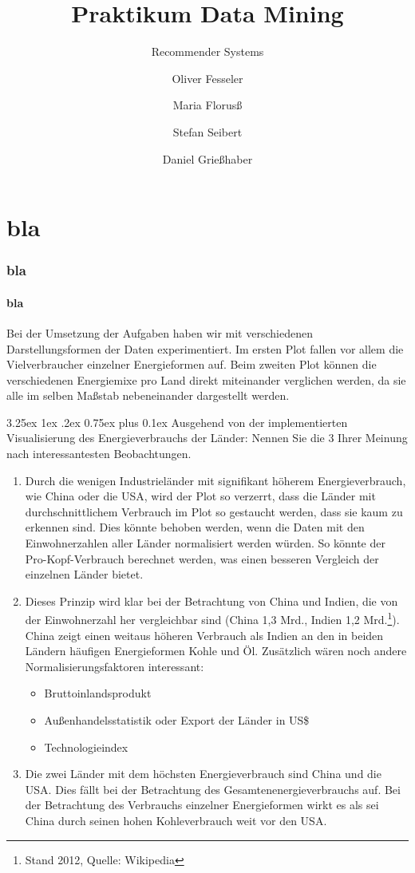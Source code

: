 \documentclass[12pt,a4paper]{scrartcl}
\makeatletter
\renewcommand\subparagraph{\@startsection{subparagraph}{5}{\parindent}%
    {3.25ex \@plus1ex \@minus .2ex}%
    {0.75ex plus 0.1ex}%
    {\normalfont\normalsize\bfseries}}
\makeatother
\begin{document}
\title{Praktikum Data Mining}
\subtitle{Recommender Systems}
\author{Oliver Fesseler \and Maria Florus\ss \and Stefan Seibert \and  Daniel Grie\ss haber}
\maketitle
\newpage

\part*{bla}

\section*{bla}
\subsection*{bla}

Bei der Umsetzung der Aufgaben haben wir mit verschiedenen Darstellungsformen der Daten experimentiert. Im ersten Plot fallen vor allem die Vielverbraucher einzelner Energieformen auf. Beim zweiten Plot k\"onnen die verschiedenen Energiemixe pro Land direkt miteinander verglichen werden, da sie alle im selben Ma\ss stab nebeneinander dargestellt werden.

\subparagraph{ Ausgehend von der implementierten Visualisierung des Energieverbrauchs der L\"ander: Nennen Sie die 3 Ihrer Meinung nach interessantesten Beobachtungen.}

\begin{enumerate}
\item Durch die wenigen Industriel\"ander mit signifikant h\"oherem Energieverbrauch, wie China oder die USA, wird der Plot so verzerrt, dass die L\"ander mit durchschnittlichem Verbrauch im Plot so gestaucht werden, dass sie kaum zu erkennen sind. Dies k\"onnte behoben werden, wenn die Daten mit den Einwohnerzahlen aller L\"ander normalisiert werden w\"urden. So k\"onnte der Pro-Kopf-Verbrauch berechnet werden, was einen besseren Vergleich der einzelnen L\"ander bietet.
\item Dieses Prinzip wird klar bei der Betrachtung von China und Indien, die von der Einwohnerzahl her vergleichbar sind (China 1,3 Mrd., Indien 1,2 Mrd.\footnote{Stand 2012, Quelle: Wikipedia}). China zeigt einen weitaus h\"oheren Verbrauch als Indien an den in beiden L\"andern h\"aufigen Energieformen Kohle und \"Ol.
Zus\"atzlich w\"aren noch andere Normalisierungsfaktoren interessant:
\begin{itemize}
\item Bruttoinlandsprodukt
\item Au\ss enhandelsstatistik oder Export der L\"ander in US\$
\item Technologieindex
\end{itemize}
\item Die zwei L\"ander mit dem h\"ochsten Energieverbrauch sind China und die USA. Dies f\"allt bei der Betrachtung des Gesamtenenergieverbrauchs auf. Bei der Betrachtung des Verbrauchs einzelner Energieformen wirkt es als sei China durch seinen hohen Kohleverbrauch weit vor den USA.
\end{enumerate}
\end{document}
